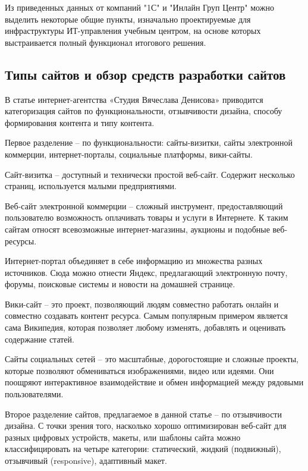 Из приведенных данных от компаний "1С" и "Инлайн Груп Центр" можно выделить некоторые общие пункты, изначально проектируемые для инфраструктуры ИТ-управления учебным центром, на основе которых выстраивается полный функционал итогового решения.

\subsection{Типы сайтов и обзор средств разработки сайтов}

В статье интернет-агентства «Студия Вячеслава Денисова» \cite{denisov} приводится категоризация сайтов по функциональности, отзывчивости дизайна, способу формирования контента и типу контента.


Первое разделение -- по функциональности: сайты-визитки, сайты электронной коммерции, интернет-порталы, социальные платформы, вики-сайты.

Сайт-визитка -- доступный и технически простой веб-сайт.
Содержит несколько страниц, используется малыми предприятиями.

Веб-сайт электронной коммерции -- сложный инструмент, предоставляющий пользователю возможность оплачивать товары и услуги в Интернете.
К таким сайтам относят всевозможные интернет-магазины, аукционы и подобные веб-ресурсы.

Интернет-портал объединяет в себе информацию из множества разных источников.
Сюда можно отнести Яндекс, предлагающий электронную почту, форумы, поисковые системы и новости на домашней странице.

Вики-сайт -- это проект, позволяющий людям совместно работать онлайн и совместно создавать контент ресурса.
Самым популярным примером является сама Википедия, которая позволяет любому изменять, добавлять и оценивать содержание статей.

Сайты социальных сетей -- это масштабные, дорогостоящие и сложные проекты, которые позволяют обмениваться изображениями, видео или идеями.
Они поощряют интерактивное взаимодействие и обмен информацией между рядовыми пользователями.


Второе разделение сайтов, предлагаемое в данной статье -- по отзывчивости дизайна.
С точки зрения того, насколько хорошо оптимизирован веб-сайт для разных цифровых устройств, макеты, или шаблоны сайта можно классифицировать на четыре категории: статический, жидкий (подвижный), отзывчивый (responsive), адаптивный макет.

